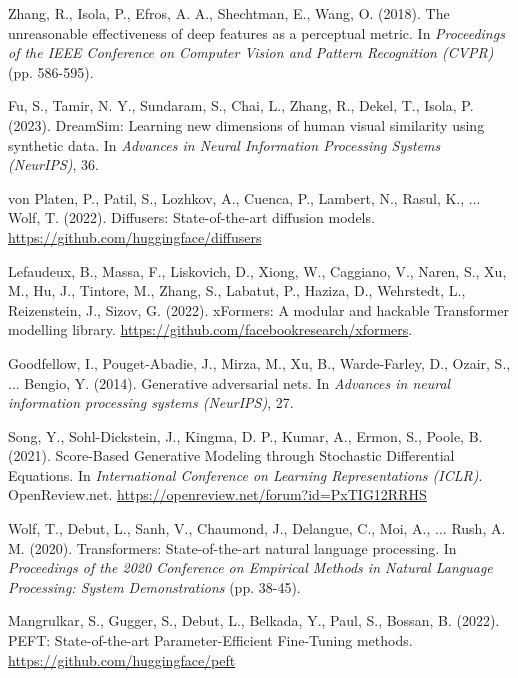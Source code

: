 \documentclass{article}
\begin{document}
{\begin{thebibliography}{99}
    Zhang, R., Isola, P., Efros, A. A., Shechtman, E.,
    Wang, O. (2018).
    The unreasonable effectiveness of deep features as a perceptual metric.
    In \textit{Proceedings of the IEEE Conference on Computer Vision and Pattern Recognition (CVPR)} (pp. 586-595).

    Fu, S., Tamir, N. Y., Sundaram, S., Chai, L., Zhang, R., Dekel, T.,
    Isola, P. (2023).
    DreamSim: Learning new dimensions of human visual similarity using synthetic data.
    In \textit{Advances in Neural Information Processing Systems (NeurIPS)}, 36.

    von Platen, P., Patil, S., Lozhkov, A., Cuenca, P., Lambert, N., Rasul, K., ...
    Wolf, T. (2022).
    Diffusers: State-of-the-art diffusion models.
    \url{https://github.com/huggingface/diffusers}

    Lefaudeux, B., Massa, F., Liskovich, D., Xiong, W., Caggiano, V., Naren, S., Xu, M., Hu, J., Tintore, M., Zhang, S., Labatut, P., Haziza, D., Wehrstedt, L., Reizenstein, J., Sizov, G. (2022).
    xFormers: A modular and hackable Transformer modelling library.
    \url{https://github.com/facebookresearch/xformers}.

    Goodfellow, I., Pouget-Abadie, J., Mirza, M., Xu, B., Warde-Farley, D., Ozair, S., ...
    Bengio, Y. (2014).
    Generative adversarial nets.
    In \textit{Advances in neural information processing systems (NeurIPS)}, 27.

    Song, Y., Sohl-Dickstein, J., Kingma, D. P., Kumar, A., Ermon, S., Poole, B. (2021). %
    Score-Based Generative Modeling through Stochastic Differential Equations. %
    In \textit{International Conference on Learning Representations (ICLR)}. %
    OpenReview.net.
    \url{https://openreview.net/forum?id=PxTIG12RRHS}

    Wolf, T., Debut, L., Sanh, V., Chaumond, J., Delangue, C., Moi, A., ...
    Rush, A. M. (2020).
    Transformers: State-of-the-art natural language processing.
    In \textit{Proceedings of the 2020 Conference on Empirical Methods in Natural Language Processing: System Demonstrations} (pp. 38-45).

    Mangrulkar, S., Gugger, S., Debut, L., Belkada, Y., Paul, S., Bossan, B. (2022).
    PEFT: State-of-the-art Parameter-Efficient Fine-Tuning methods.
    \url{https://github.com/huggingface/peft}


\end{thebibliography}}
\end{document}
